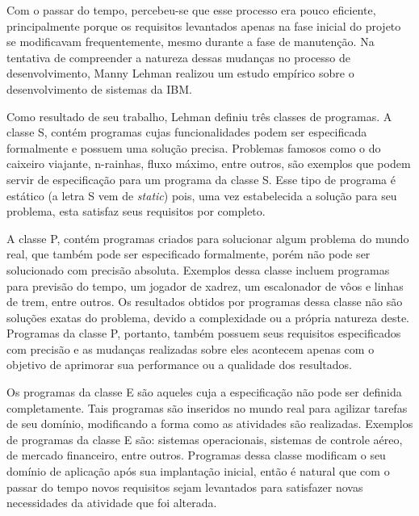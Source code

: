 \documentclass[a4paper, 12pt, twoside]{book}
\begin{document}
        Com o passar do tempo, percebeu-se que esse processo era pouco eficiente, principalmente porque os requisitos
        levantados apenas na fase inicial do projeto se modificavam frequentemente, mesmo durante a 
        fase de manutenção. Na tentativa de compreender a natureza dessas mudanças no processo de desenvolvimento, 
        Manny Lehman realizou um estudo empírico sobre o desenvolvimento de sistemas da IBM.
        
        Como resultado de seu trabalho, Lehman definiu três classes de programas. A classe S, contém programas 
        cujas funcionalidades podem ser especificada formalmente e possuem uma solução precisa. Problemas famosos 
        como o do caixeiro viajante, n-rainhas, fluxo máximo, entre outros, são exemplos que 
        podem servir de especificação para um programa da classe S. Esse tipo de programa é 
        estático (a letra S vem de \textit{static}) pois, uma vez estabelecida a solução para seu problema, esta 
        satisfaz seus requisitos por completo.
        
        A classe P, contém programas criados para solucionar algum problema do mundo real, que também pode
        ser especificado formalmente, porém não pode ser solucionado com precisão absoluta. Exemplos dessa classe
        incluem programas para previsão do tempo, um jogador de xadrez, um escalonador de vôos e linhas de trem, entre 
        outros. Os resultados obtidos por programas dessa classe não são soluções exatas do problema, devido a 
        complexidade ou a própria natureza deste. Programas da classe P, portanto, também possuem seus requisitos 
        especificados com precisão e as mudanças realizadas sobre eles acontecem apenas com o objetivo de aprimorar
        sua performance ou a qualidade dos resultados.
        
        Os programas da classe E são aqueles cuja a especificação não pode ser definida completamente. Tais programas
        são inseridos no mundo real para agilizar tarefas de seu domínio, modificando a forma como as atividades são 
        realizadas. Exemplos de programas da classe E são: sistemas operacionais, sistemas de controle aéreo, de mercado 
        financeiro, entre outros. Programas dessa classe modificam o seu domínio de aplicação após sua implantação 
        inicial, então é natural que com o passar do tempo novos requisitos sejam levantados para satisfazer 
        novas necessidades da atividade que foi alterada. 
        
\end{document}
